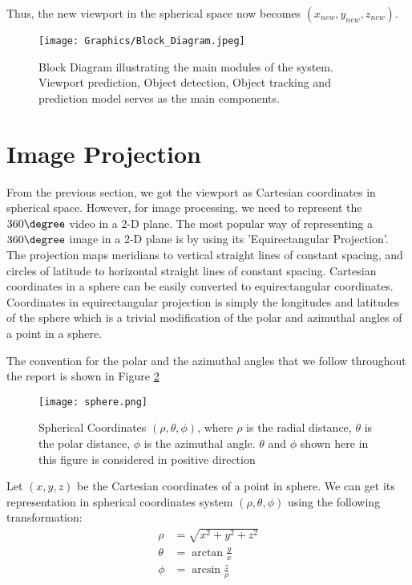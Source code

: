 Thus, the new viewport in the spherical space now becomes \((x_{new}, y_{new}, z_{new})\). 

\begin{figure}[t]
    \centering
    \texttt{[image: Graphics/Block\_Diagram.jpeg]}
    \caption{Block Diagram illustrating the main modules of the system. Viewport prediction, Object detection, Object tracking and prediction model serves as the main components.}
    \label{fig:block_dia}
\end{figure}

\section{Image Projection}
From the previous section, we got the viewport as Cartesian coordinates in spherical space. However, for image processing, we need to represent the $360\degree$ video in a 2-D plane. The most popular way of representing a $360\degree$ image in a 2-D plane is by using its 'Equirectangular Projection'.  The projection maps meridians to vertical straight lines of constant spacing, and circles of latitude to horizontal straight lines of constant spacing. Cartesian coordinates in a sphere can be easily converted to equirectangular coordinates. Coordinates in equirectangular projection is simply the longitudes and latitudes of the sphere which is a trivial modification of the polar and azimuthal angles of a point in a sphere.
\par
The convention for the polar and the azimuthal angles that we follow throughout the report is shown in Figure \ref{fig:spherical_conv}
\begin{figure}[h]
  \centering
    \texttt{[image: sphere.png]}
  \caption{Spherical Coordinates \((\rho, \theta, \phi)\), where $\rho$ is the radial distance, $\theta$ is the polar distance, $\phi$ is the azimuthal angle. $\theta$ and $\phi$ shown here in this figure is considered in positive direction}
  \label{fig:spherical_conv}
\end{figure}

Let \((x,y,z)\) be the Cartesian coordinates of a point in sphere. We can get its representation in spherical coordinates system \((\rho, \theta, \phi)\) using the following transformation:
\begin{equation*}
\begin{split}
\rho  &= \sqrt{x^2+y^2+z^2} \\ 
\theta &= \arctan{\frac{y}{x}} \\
\phi &= \arcsin{\frac{z}{\rho}}
\end{split}
\end{equation*}

